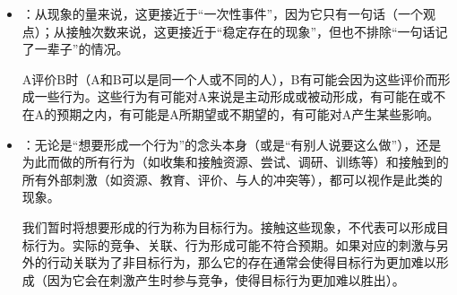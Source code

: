\begin{explain}
\begin{itemize}
常见的此类现象包括但不限于“某个突发的重大消息”、“记了一辈子的某一句话”、“某段不敢回忆的被封闭的经历”等等。这可以说明，现象对人的影响不由“接触的时长”而决定，而由“深入内心的程度”（这只是“形成/覆盖了多少行为”的一种更感性的描述）而决定。
\item {}：从现象的量来说，这更接近于“一次性事件”，因为它只有一句话（一个观点）；从接触次数来说，这更接近于“稳定存在的现象”，但也不排除“一句话记了一辈子”的情况。

A评价B时（A和B可以是同一个人或不同的人），B有可能会因为这些评价而形成一些行为。这些行为有可能对A来说是主动形成或被动形成，有可能在或不在A的预期之内，有可能是A所期望或不期望的，有可能对A产生某些影响。
\item {}：无论是“想要形成一个行为”的念头本身（或是“有别人说要这么做”），还是为此而做的所有行为（如收集和接触资源、尝试、调研、训练等）和接触到的所有外部刺激（如资源、教育、评价、与人的冲突等），都可以视作是此类的现象。

我们暂时将想要形成的行为称为目标行为。接触这些现象，不代表可以形成目标行为。实际的竞争、关联、行为形成可能不符合预期。如果对应的刺激与另外的行动关联为了非目标行为，那么它的存在通常会使得目标行为更加难以形成（因为它会在刺激产生时参与竞争，使得目标行为更加难以胜出）。
\end{itemize}
\end{explain}


